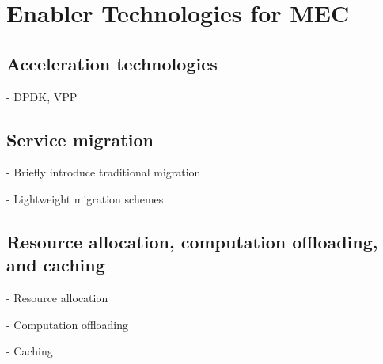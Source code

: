\section{Enabler Technologies for MEC} \label{tech}

\subsection{Acceleration technologies}

- DPDK, VPP

\subsection{Service migration}

- Briefly introduce traditional migration

- Lightweight migration schemes 


\subsection{Resource allocation, computation offloading, and caching}

- Resource allocation

- Computation offloading

- Caching


